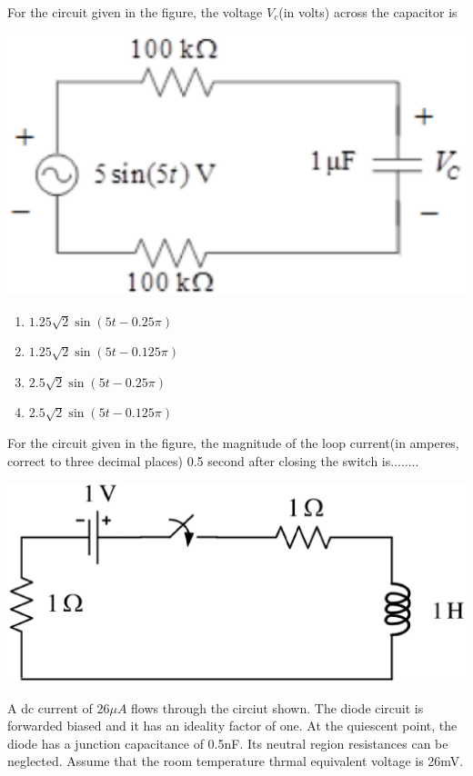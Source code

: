 \item For the circuit given in the figure, the voltage $V_c$(in volts) across the capacitor is

\includegraphics[scale=0.4]{45}

\begin{enumerate}
\item $1.25\sqrt{2}\sin(5t - 0.25\pi)$
\item $1.25\sqrt{2}\sin(5t - 0.125\pi)$
\item $2.5\sqrt{2}\sin(5t - 0.25\pi)$
\item $2.5\sqrt{2}\sin(5t - 0.125\pi)$
\end{enumerate}

\item For the circuit given in the figure, the magnitude of the loop current(in amperes, correct to three decimal places) 0.5 second after closing the switch is........

\includegraphics[scale=0.3]{46}

\item A dc current of $26\mu A$ flows through the circiut shown. The diode circuit is forwarded biased and it has an ideality factor of one. At the quiescent point, the diode has a junction capacitance of 0.5nF. Its neutral region resistances can be neglected. Assume that the room temperature thrmal equivalent voltage is 26mV.

